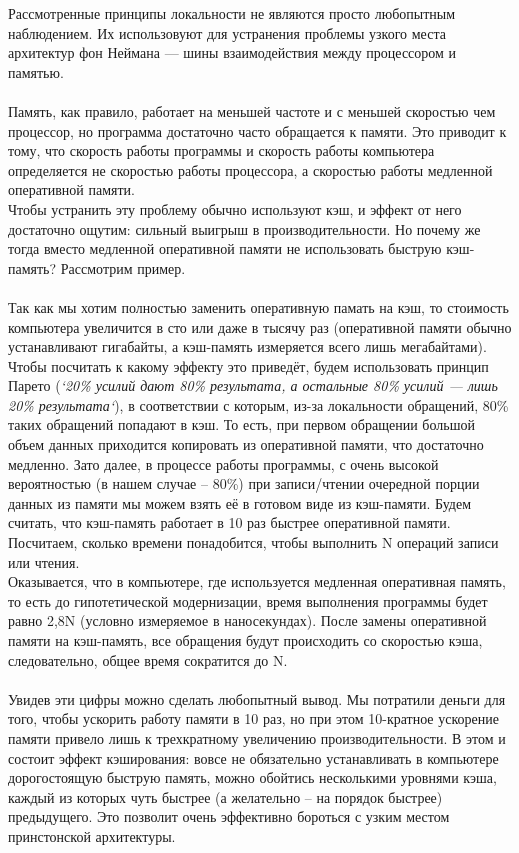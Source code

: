  Рассмотренные принципы локальности не являются просто любопытным наблюдением. Их использовуют для устранения проблемы узкого места архитектур фон Неймана — шины взаимодействия между процессором и памятью.
 \\
 \\ Память, как правило, работает на меньшей частоте и с меньшей скоростью чем процессор, но программа достаточно часто обращается к памяти. Это приводит к тому, что скорость работы программы и скорость работы компьютера определяется не скоростью работы процессора, а скоростью работы медленной оперативной памяти.
\\Чтобы устранить эту проблему обычно используют кэш, и эффект от него достаточно ощутим: сильный выигрыш в производительности.
Но почему же тогда вместо медленной оперативной памяти не использовать быструю кэш-память? Рассмотрим пример.
\\
\\Так как мы хотим полностью заменить оперативную памать на кэш, то стоимость компьютера увеличится в сто или даже в тысячу раз (оперативной памяти обычно устанавливают гигабайты, а кэш-память измеряется всего лишь мегабайтами). 
\\Чтобы посчитать к какому эффекту это приведёт, будем использовать принцип Парето (\emph{`20\% усилий дают 80\% результата, а остальные 80\% усилий — лишь 20\% результата`}), в соответствии с которым, из-за локальности обращений, 80\% таких обращений попадают в кэш. То есть, при первом обращении большой объем данных приходится копировать из оперативной памяти, что достаточно медленно. Зато далее, в процессе работы программы, с очень высокой вероятностью (в нашем случае – 80\%) при записи/чтении очередной порции данных из памяти мы можем взять её в готовом виде из кэш-памяти. Будем считать, что кэш-память работает в 10 раз быстрее оперативной памяти.
\\Посчитаем, сколько времени понадобится, чтобы выполнить N операций записи или чтения. 
\\Оказывается, что в компьютере, где используется медленная оперативная память, то есть до гипотетической модернизации, время выполнения программы будет равно 2,8N (условно измеряемое в наносекундах).
После замены оперативной памяти на кэш-память, все обращения будут происходить со скоростью кэша, следовательно, общее время сократится до N.
\\
\\
Увидев эти цифры можно сделать любопытный вывод. Мы потратили деньги для того, чтобы ускорить работу памяти в 10 раз, но при этом 10-кратное ускорение памяти привело лишь к трехкратному увеличению производительности. 
В этом и состоит эффект кэширования: вовсе не обязательно устанавливать в компьютере дорогостоящую быструю память, можно обойтись несколькими уровнями кэша, каждый из которых чуть быстрее (а желательно – на порядок быстрее) предыдущего. Это позволит очень эффективно бороться с узким местом принстонской архитектуры.

